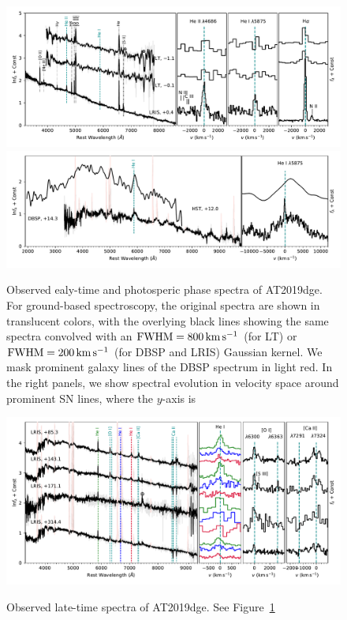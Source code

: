 \documentclass[twocolumn]{aastex63}
\begin{document}
\begin{CJK*}{UTF8}{gbsn}
\begin{figure}[htbp!]
	\centering
	\includegraphics[width=\textwidth]{figures/spectra_early.pdf}
	\includegraphics[width=\textwidth]{figures/spectra_phot.pdf}
	\caption{Observed ealy-time and photosperic phase spectra of AT2019dge. For ground-based 
		spectroscopy, the original spectra are	shown in translucent colors, with the overlying black 
		lines showing the same spectra convolved with an 
		${\rm FWHM} = 800\, {\rm km\, s^{-1}}$ (for LT) or ${\rm FWHM} = 200\, {\rm km\, 
			s^{-1}}$ (for DBSP and LRIS) Gaussian kernel. We mask prominent galaxy lines of the 
		DBSP spectrum in light red. In the right panels, we show spectral 
		evolution in velocity space around prominent SN lines, where the $y$-axis is 
		\label{fig:spectra}}
\end{figure}
\begin{figure}[htbp!]
	\centering
	\includegraphics[width=\textwidth]{figures/spectra_late.pdf}\\
	\caption{Observed late-time spectra of AT2019dge. See 
		Figure~\ref{fig:spectra}
		\label{fig:spectra_late}}
\end{figure}


\end{CJK*}
\end{document}
